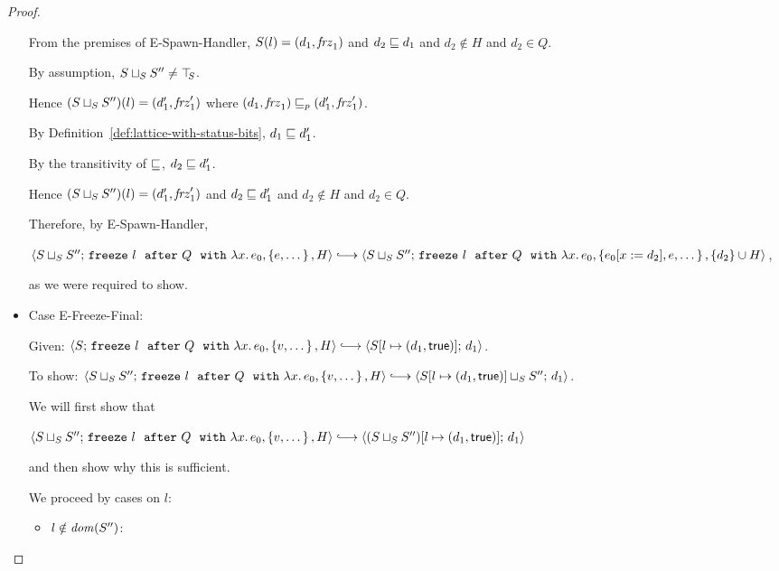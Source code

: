 \begin{proof}
\begin{itemize}
      From the premises of {\sc E-Spawn-Handler}, $S(l) =
      (d_1, \mathit{frz}_1)$ and $d_2 \sqsubseteq d_1$ and $d_2 \notin
      H$ and $d_2 \in Q$.

      By assumption, $S \sqcup_{S} S'' \neq \top\hspace{-0.85mm}_{S}$.

      Hence $(S \sqcup_{S} S'')(l) = (d'_1, \mathit{frz}'_1)$ where
      $(d_1, \mathit{frz}_1) \sqsubseteq_p (d'_1, \mathit{frz}'_1)$.

      By Definition~\ref{def:lattice-with-status-bits}, $d_1 \sqsubseteq
      d'_1$.

      By the transitivity of $\sqsubseteq$, $d_2 \sqsubseteq d'_1$.

      Hence $(S \sqcup_{S} S'')(l) =
      (d'_1, \mathit{frz}'_1)$ and $d_2 \sqsubseteq d'_1$ and $d_2 \notin
      H$ and $d_2 \in Q$.

      Therefore, by {\sc E-Spawn-Handler},

      $\config{\lubstore{S}{S''}}{\freezeafterfull{l}{Q}{\lam{x}{e_0}}{\setof{e,
            \dots}}{H}} \parstepsto
      \config{\lubstore{S}{S''}}{\freezeafterfull{l}{Q}{\lam{x}{e_0}}{\setof{\subst{e_0}{x}{d_2},
            e, \dots}} {\{d_2\}\cup H}}$,

      as we were required to show.

    \item Case {\sc E-Freeze-Final}:


      Given:
      $\config{S}{\freezeafterfull{l}{Q}{\lam{x}{e_0}}{\setof{v,
            \dots}}{H}} \parstepsto
      \config{\extS{S}{l}{d_1}{\frozentrue}}{d_1}$.

      To show:
      $\config{\lubstore{S}{S''}}{\freezeafterfull{l}{Q}{\lam{x}{e_0}}{\setof{v,
            \dots}}{H}} \parstepsto
      \config{\lubstore{\extS{S}{l}{d_1}{\frozentrue}}{S''}}{d_1}$.

      We will first show that

      $\config{\lubstore{S}{S''}}{\freezeafterfull{l}{Q}{\lam{x}{e_0}}{\setof{v,
            \dots}}{H}} \parstepsto
      \config{\extS{(\lubstore{S}{S''})}{l}{d_1}{\frozentrue}}{d_1}$

      and then show why this is sufficient.

      We proceed by cases on $l$:
      \begin{itemize}
      \item $l \notin \mathit{dom}(S'')$:


\end{itemize}
\end{itemize}
\end{proof}
